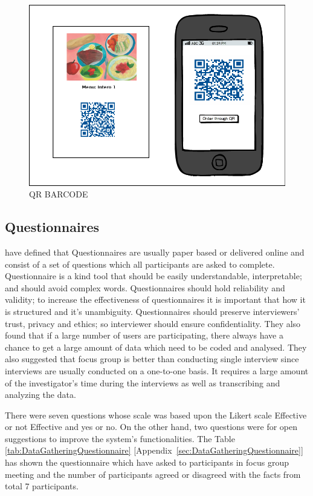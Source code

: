 \begin{figure}[h!t]
    \centering
      \includegraphics[width=5.5in]{ch3/FocusGroup/QRBARCODE}
  \caption{QR BARCODE}
  \label{QRBARCODE}
\end{figure}

\subsection{Questionnaires}
\label{subsec:Questionnaires}
\citet{AdamsAnneandCox2008} have defined that Questionnaires are usually paper
based or delivered online and consist of a set of questions which all
participants are asked to complete. Questionnaire is a kind tool that should be
easily understandable, interpretable; and should avoid complex words.
Questionnaires should hold reliability and validity; to increase the
effectiveness of questionnaires it is important that how it is structured and
it's unambiguity. Questionnaires should preserve interviewers' trust, privacy
and ethics; so interviewer should ensure confidentiality.
They also found that if a large number of users are participating, there
always have a chance to get a large amount of data which need to be coded and
analysed. They also suggested that focus group is better than conducting
single interview since interviews are usually conducted on a one-to-one basis.
It requires a large amount of the investigator's time during the interviews as
well as  transcribing and analyzing the data.

There were seven questions whose scale was based upon the Likert scale Effective
or not Effective and yes or no. On the other hand, two questions were for open
suggestions to improve the system's functionalities. The Table
\ref{tab:DataGatheringQuestionnaire}
[Appendix~\ref{sec:DataGatheringQuestionnaire}] has shown the questionnaire
which have asked to participants in focus group meeting and the number of
participants agreed or disagreed with the facts from total 7 participants.

